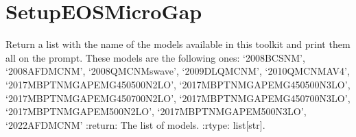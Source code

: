 \documentclass[letterpaper,10pt,english]{sphinxmanual}
\begin{document}
\sphinxstepscope


\section{SetupEOSMicroGap}
\label{\detokenize{source/api/setup_eos_micro_gap:setupeosmicrogap}}\label{\detokenize{source/api/setup_eos_micro_gap::doc}}\label{\detokenize{source/api/setup_eos_micro_gap:module-nucleardatapy.eos.setup_micro_gap}}

\begin{fulllineitems}
\label{\detokenize{source/api/setup_eos_micro_gap:nucleardatapy.eos.setup_micro_gap.micro_gap_models}}
\pysigstartsignatures
{}
\pysigstopsignatures
\sphinxAtStartPar
Return a list with the name of the models available in this toolkit and     print them all on the prompt. These models are the following ones:     ‘2008\sphinxhyphen{}BCS\sphinxhyphen{}NM’, ‘2008\sphinxhyphen{}AFDMC\sphinxhyphen{}NM’,     ‘2008\sphinxhyphen{}QMC\sphinxhyphen{}NM\sphinxhyphen{}swave’, ‘2009\sphinxhyphen{}DLQMC\sphinxhyphen{}NM’, ‘2010\sphinxhyphen{}QMC\sphinxhyphen{}NM\sphinxhyphen{}AV4’, ‘2017\sphinxhyphen{}MBPT\sphinxhyphen{}NM\sphinxhyphen{}GAP\sphinxhyphen{}EMG\sphinxhyphen{}450\sphinxhyphen{}500\sphinxhyphen{}N2LO’,     ‘2017\sphinxhyphen{}MBPT\sphinxhyphen{}NM\sphinxhyphen{}GAP\sphinxhyphen{}EMG\sphinxhyphen{}450\sphinxhyphen{}500\sphinxhyphen{}N3LO’, ‘2017\sphinxhyphen{}MBPT\sphinxhyphen{}NM\sphinxhyphen{}GAP\sphinxhyphen{}EMG\sphinxhyphen{}450\sphinxhyphen{}700\sphinxhyphen{}N2LO’,     ‘2017\sphinxhyphen{}MBPT\sphinxhyphen{}NM\sphinxhyphen{}GAP\sphinxhyphen{}EMG\sphinxhyphen{}450\sphinxhyphen{}700\sphinxhyphen{}N3LO’, ‘2017\sphinxhyphen{}MBPT\sphinxhyphen{}NM\sphinxhyphen{}GAP\sphinxhyphen{}EM\sphinxhyphen{}500\sphinxhyphen{}N2LO’, ‘2017\sphinxhyphen{}MBPT\sphinxhyphen{}NM\sphinxhyphen{}GAP\sphinxhyphen{}EM\sphinxhyphen{}500\sphinxhyphen{}N3LO’,     ‘2022\sphinxhyphen{}AFDMC\sphinxhyphen{}NM’
:return: The list of models.
:rtype: list{[}str{]}.

\end{fulllineitems}
\end{document}
